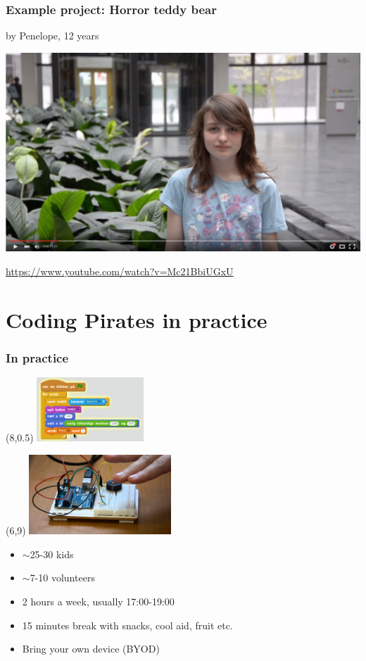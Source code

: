 \documentclass{beamer}
\begin{document}
\begin{frame}
  \frametitle{Example project: Horror teddy bear}
  by Penelope, 12 years
  \vspace{7mm}

  \includegraphics[width=\textwidth]{imagery/penelope-raedselsbamse}

  \url{https://www.youtube.com/watch?v=Mc21BbiUGxU}
\end{frame}



\section{Coding Pirates in practice}
\begin{frame}
\frametitle{In practice}

\begin{textblock}{20}(8,0.5)
 \includegraphics[width=0.3\textwidth]{imagery/scratch}
\end{textblock}

\begin{textblock}{20}(6,9)
  \includegraphics[width=0.4\textwidth]{imagery/arduino-theremin}
\end{textblock}

\begin{itemize}
\item $\sim$25-30 kids
\item $\sim$7-10 volunteers
\item 2 hours a week, usually 17:00-19:00
\item 15 minutes break with snacks, cool aid, fruit etc.
\item Bring your own device (BYOD)
\end{itemize}
\vspace{2cm}

\end{frame}
\end{document}
